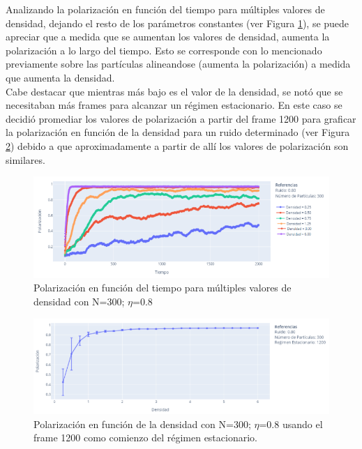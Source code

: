 \documentclass[12pt, a4paper]{report}
\begin{document}
Analizando la polarización en función del tiempo para múltiples valores de densidad, dejando el resto de los parámetros constantes (ver Figura \ref{fig:density_pola_vs_time}), se puede apreciar que a medida que se aumentan los valores de densidad, aumenta la polarización a lo largo del tiempo. Esto se corresponde con lo mencionado previamente sobre las partículas alineandose (aumenta la polarización) a medida que aumenta la densidad.\\

Cabe destacar que mientras más bajo es el valor de la densidad, se notó que se necesitaban más frames para alcanzar un régimen estacionario. En este caso se decidió promediar los valores de polarización a partir del frame 1200 para graficar la polarización en función de la densidad para un ruido determinado (ver Figura \ref{fig:pola_vs_density}) debido a que aproximadamente a partir de allí los valores de polarización son similares.\\


\begin{figure}[h]
\includegraphics[scale=0.5]{density_pola_vs_time.png}
\centering 
\caption{Polarización en función del tiempo para múltiples valores de densidad con N=300; $\eta$=0.8}
\label{fig:density_pola_vs_time}
\end{figure}

\begin{figure}[h]
\includegraphics[scale=0.5]{pola_vs_density.png}
\centering 
\caption{Polarización en función de la densidad con N=300; $\eta$=0.8 usando el frame 1200 como comienzo del régimen estacionario.}
\label{fig:pola_vs_density}
\end{figure}
\end{document}
